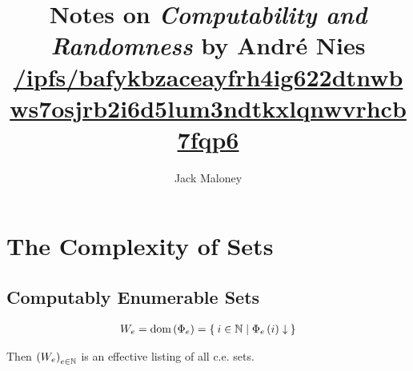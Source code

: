 \documentclass[11pt]{article}
\title{Notes on \textit{Computability and Randomness} by André Nies \\
	\small{\href{https://ipfs.io/ipfs/bafykbzaceayfrh4ig622dtnwbws7osjrb2i6d5lum3ndtkxlqnwvrhcb7fqp6}
	{/ipfs/bafykbzaceayfrh4ig622dtnwbws7osjrb2i6d5lum3ndtkxlqnwvrhcb7fqp6}}}
\author{Jack Maloney}
\date{}
\renewcommand{\P}[1]{{\Phi}_{#1}}
\newcommand{\Pe}{\P{e}}
\newcommand{\PP}[2]{ \P{#1} \Parens{#2} }
\newcommand{\PeP}[1]{ \PP{e}{#1} }
\newcommand{\Cvgs}[1]{{#1 \converges}}
\begin{document}
\maketitle

\section{The Complexity of Sets}

\subsection{Computably Enumerable Sets}

\begin{align}
	W_e 
	= \text{dom} \Parens{\Pe} 
	= \Set{ i \in \N | \Cvgs{\PeP{i}} }
\end{align}

Then \( \left( W_e \right)_{e \in \mathbb{N}} \) is an effective listing of all c.e. sets.
\end{document}
